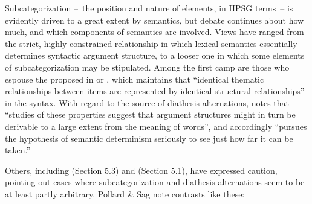 \documentclass[output=paper
                ,modfonts
                ,nonflat
	        ,collection
	        ,collectionchapter
	        ,collectiontoclongg
 	        ,biblatex
                ,babelshorthands
                ,newtxmath
                ,draftmode
                ,colorlinks, citecolor=brown
]{./langsci/langscibook}
\begin{document}
Subcategorization --~the position and nature of \argst elements, in HPSG terms~-- is evidently driven to a great extent by semantics,
but debate continues about how much, and which components of semantics are involved.
Views have ranged from the strict, highly constrained relationship in which lexical semantics essentially determines syntactic argument structure, to a looser one in which some elements of subcategorization may be stipulated.
Among  the first camp are those who espouse the   proposed in \citet[46]{Baker1988} or \citet{Baker1997}, which maintains that ``identical thematic relationships between items are represented by identical structural relationships'' in the syntax.
With regard to the source of  diathesis alternations, \citet[12-13]{Levin1993} notes that ``studies of these properties suggest that argument structures might in turn be derivable to a large extent from the meaning of words'', and accordingly ``pursues the hypothesis of semantic determinism seriously to see just how far it can be taken.''

Others, including \citet{pollard+sag:1987} (Section 5.3) and \citet{Davis2001} (Section 5.1), have expressed caution, pointing out cases where subcategorization and diathesis alternations  seem to be at least partly arbitrary.
Pollard \& Sag note contrasts like these:
\end{document}

